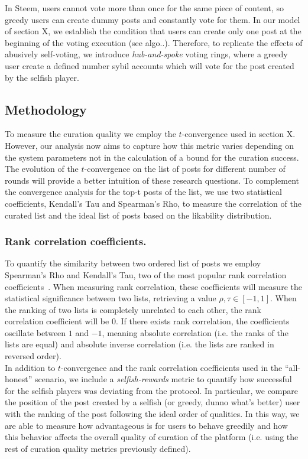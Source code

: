       In Steem, users cannot vote more than once for the same piece of content,
      so greedy users can create dummy posts and constantly vote for them. In
      our model of section X, we establish the condition that users can create
      only one post at the beginning of the voting execution (see algo..).
      Therefore, to replicate the effects of abusively self-voting, we introduce
      \textit{hub-and-spoke} voting rings, where a greedy user create a defined
      number sybil accounts which will vote for the post created by the selfish
      player.

  \subsection{Methodology}
    To measure the curation quality we employ the $t$-convergence used in
    section X. However, our analysis now aims to capture how this metric varies
    depending on the system parameters not in the calculation of a bound for the
    curation success. The evolution of the $t$-convergence on the list of
    posts for different number of rounds will provide a better intuition of
    these research questions. To complement the convergence analysis for the
    top-t posts of the list, we use two statistical coefficients, Kendall's Tau
    and Spearman's Rho, to measure the correlation of the curated list and the
    ideal list of posts based on the likability distribution.

    \subsubsection*{Rank correlation coefficients.}
      To quantify the similarity between two ordered list of posts we employ
      Spearman's Rho and Kendall's Tau, two of the most popular rank correlation
      coefficients~\cite{kendall1955rank}.  When measuring rank correlation,
      these coefficients will measure the statistical significance between two
      lists, retrieving a value $\rho,\tau \in [-1 , 1]$. When the ranking of
      two lists is completely unrelated to each other, the rank correlation
      coefficient will be $0$. If there exists rank correlation, the
      coefficients oscillate between $1$ and $-1$, meaning absolute correlation
      (i.e. the ranks of the lists are equal) and absolute inverse correlation
      (i.e. the lists are ranked in reversed order).\\

    In addition to $t$-convergence and the rank correlation coefficients
    used in the ``all-honest'' scenario, we include a \textit{selfish-rewards}
    metric to quantify how successful for the selfish players was deviating from
    the protocol. In particular, we compare the position of the post created by
    a selfish (or greedy, dunno what's better) user with the ranking of the post
    following the ideal order of qualities. In this way, we are able to measure
    how advantageous is for users to behave greedily and how this behavior
    affects the overall quality of curation of the platform (i.e. using the rest
    of curation quality metrics previously defined).

